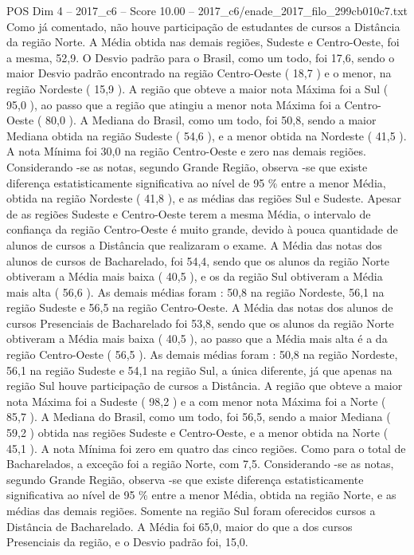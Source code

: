 \begin{textsample}{POS Dim 4 – 2017\_c6 – Score 10.00 – 2017\_c6/enade\_2017\_filo\_299cb010c7.txt}
Como já comentado, não houve participação de estudantes de cursos a Distância da região Norte.
A Média obtida nas demais regiões, Sudeste e Centro-Oeste, foi a mesma, 52,9.
O Desvio padrão para o Brasil, como um todo, foi 17,6, sendo o maior Desvio padrão encontrado na região Centro-Oeste ( 18,7 ) e o menor, na região Nordeste ( 15,9 ).
A região que obteve a maior nota Máxima foi a Sul ( 95,0 ), ao passo que a região que atingiu a menor nota Máxima foi a Centro-Oeste ( 80,0 ).
A Mediana do Brasil, como um todo, foi 50,8, sendo a maior Mediana obtida na região Sudeste ( 54,6 ), e a menor obtida na Nordeste ( 41,5 ).
A nota Mínima foi 30,0 na região Centro-Oeste e zero nas demais regiões.
Considerando -se as notas, segundo Grande Região, observa -se que existe diferença estatisticamente significativa ao nível de 95 \% entre a menor Média, obtida na região Nordeste ( 41,8 ), e as médias das regiões Sul e Sudeste.
Apesar de as regiões Sudeste e Centro-Oeste terem a mesma Média, o intervalo de confiança da região Centro-Oeste é muito grande, devido à pouca quantidade de alunos de cursos a Distância que realizaram o exame.
A Média das notas dos alunos de cursos de Bacharelado, foi 54,4, sendo que os alunos da região Norte obtiveram a Média mais baixa ( 40,5 ), e os da região Sul obtiveram a Média mais alta ( 56,6 ).
As demais médias foram : 50,8 na região Nordeste, 56,1 na região Sudeste e 56,5 na região Centro-Oeste.
A Média das notas dos alunos de cursos Presenciais de Bacharelado foi 53,8, sendo que os alunos da região Norte obtiveram a Média mais baixa ( 40,5 ), ao passo que a Média mais alta é a da região Centro-Oeste ( 56,5 ).
As demais médias foram : 50,8 na região Nordeste, 56,1 na região Sudeste e 54,1 na região Sul, a única diferente, já que apenas na região Sul houve participação de cursos a Distância.
A região que obteve a maior nota Máxima foi a Sudeste ( 98,2 ) e a com menor nota Máxima foi a Norte ( 85,7 ).
A Mediana do Brasil, como um todo, foi 56,5, sendo a maior Mediana ( 59,2 ) obtida nas regiões Sudeste e Centro-Oeste, e a menor obtida na Norte ( 45,1 ).
A nota Mínima foi zero em quatro das cinco regiões.
Como para o total de Bacharelados, a exceção foi a região Norte, com 7,5.
Considerando -se as notas, segundo Grande Região, observa -se que existe diferença estatisticamente significativa ao nível de 95 \% entre a menor Média, obtida na região Norte, e as médias das demais regiões.
Somente na região Sul foram oferecidos cursos a Distância de Bacharelado.
A Média foi 65,0, maior do que a dos cursos Presenciais da região, e o Desvio padrão foi, 15,0.

\end{textsample}
